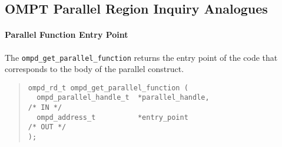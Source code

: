 \subsection{OMPT Parallel Region Inquiry Analogues}

\paragraph{Parallel Function Entry Point}

The \texttt{ompd\_get\_parallel\_function} returns the
entry point of the code that corresponds to the body of
the parallel construct.

\begin{quote}
\begin{lstlisting}
ompd_rd_t ompd_get_parallel_function (
  ompd_parallel_handle_t  *parallel_handle,                         /* IN */
  ompd_address_t          *entry_point                             /* OUT */
);
\end{lstlisting}
\end{quote}
